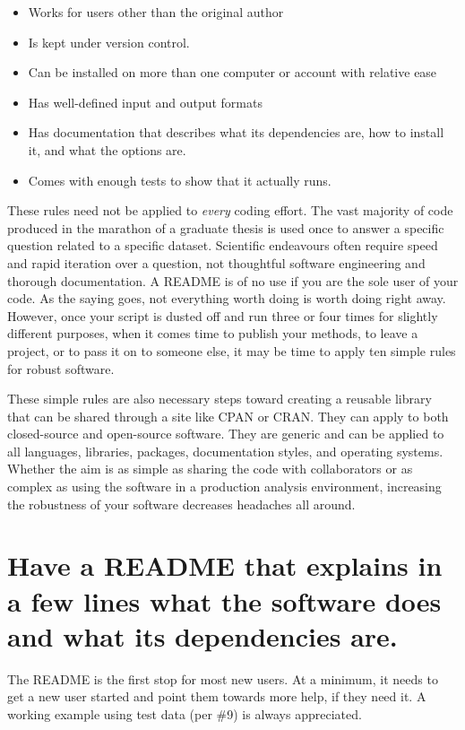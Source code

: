 \documentclass[10pt]{article}
\begin{document}
\begin{itemize}
\item
  Works for users other than the original author
\item
  Is kept under version control.
\item
  Can be installed on more than one computer or account with relative ease
\item
  Has well-defined input and output formats
\item
  Has documentation that describes what its dependencies are, how to
  install it, and what the options are.
\item
  Comes with enough tests to show that it actually runs.
\end{itemize}

These rules need not be applied to \emph{every} coding effort. The vast majority of
code produced in the marathon of a graduate thesis is used once to answer a
specific question related to a specific dataset. Scientific endeavours often
require speed and rapid iteration over a question, not thoughtful software
engineering and thorough documentation. A README is of no use if you are the
sole user of your code. As the saying goes, not everything worth doing is worth
doing right away. However, once your script is dusted off and run three or four
times for slightly different purposes, when it comes time to publish your
methods, to leave a project, or to pass it on to someone else, it may be time
to apply ten simple rules for robust software.

These simple rules are also necessary steps toward creating a reusable library that
can be shared through a site like CPAN or CRAN. They can apply to both
closed-source and open-source software.  They are generic and can be applied to all
languages, libraries, packages, documentation styles, and
operating systems.  Whether the aim is as simple as sharing the code
with collaborators or as complex as using the software in a production
analysis environment, increasing the robustness of your software
decreases headaches all around.

\section{Have a README that explains in a few lines what the software does and what its dependencies are.}

The README is the first stop for most new users.
At a minimum, it needs to get a new user started and point them towards more
help, if they need it.
A working example using test data (per
\#9) is always appreciated.
\end{document}
